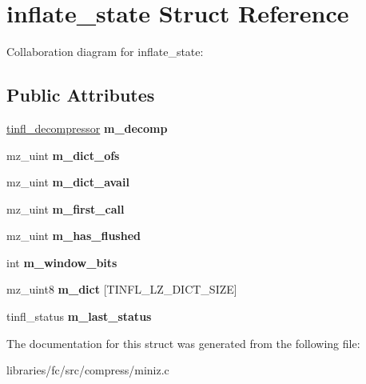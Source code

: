\hypertarget{structinflate__state}{}\section{inflate\+\_\+state Struct Reference}
\label{structinflate__state}


Collaboration diagram for inflate\+\_\+state\+:
\subsection*{Public Attributes}
\begin{DoxyCompactItemize}
\item 
\mbox{\label{structinflate__state_aa112419e6fc485a0569d89b0dac4c40d}} 
\mbox{\hyperlink{structtinfl__decompressor__tag}{tinfl\+\_\+decompressor}} {\bfseries m\+\_\+decomp}
\item 
\mbox{\label{structinflate__state_a26b59390ae38c5a0ee081a729479b89f}} 
mz\+\_\+uint {\bfseries m\+\_\+dict\+\_\+ofs}
\item 
\mbox{\label{structinflate__state_a45eb73702d5588b380842d55633adfa1}} 
mz\+\_\+uint {\bfseries m\+\_\+dict\+\_\+avail}
\item 
\mbox{\label{structinflate__state_a8ed1d9e9a13f5e5f5c4229c67509a5a1}} 
mz\+\_\+uint {\bfseries m\+\_\+first\+\_\+call}
\item 
\mbox{\label{structinflate__state_a26ee41a3a0d93350c737252334fe783f}} 
mz\+\_\+uint {\bfseries m\+\_\+has\+\_\+flushed}
\item 
\mbox{\label{structinflate__state_a05183fc4ee620dfaac7cdde5c17697a9}} 
int {\bfseries m\+\_\+window\+\_\+bits}
\item 
\mbox{\label{structinflate__state_a6d9569803f5139b8bb11b409f69f598b}} 
mz\+\_\+uint8 {\bfseries m\+\_\+dict} \mbox{[}T\+I\+N\+F\+L\+\_\+\+L\+Z\+\_\+\+D\+I\+C\+T\+\_\+\+S\+I\+ZE\mbox{]}
\item 
\mbox{\label{structinflate__state_a9d2e5eba1b8c7a5bf78289b7a412f154}} 
tinfl\+\_\+status {\bfseries m\+\_\+last\+\_\+status}
\end{DoxyCompactItemize}


The documentation for this struct was generated from the following file\+:\begin{DoxyCompactItemize}
\item 
libraries/fc/src/compress/miniz.\+c\end{DoxyCompactItemize}
